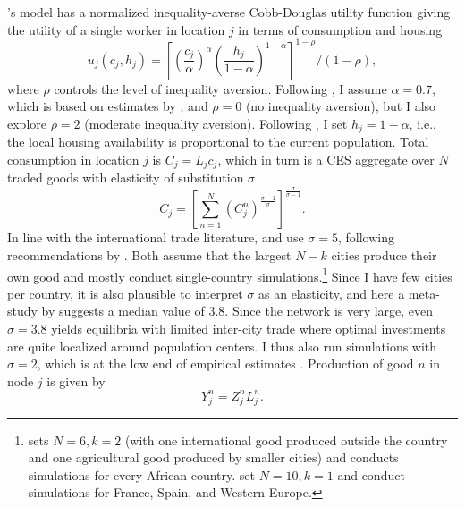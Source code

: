 \documentclass[a4paper]{article}
\begin{document}
\citet{fajgelbaum2020optimal}'s model has a normalized inequality-averse Cobb-Douglas utility function giving the utility of a single worker in location $j$ in terms of consumption and housing
\begin{equation}
u_j(c_j, h_j) = \left[\left(\frac{c_j}{\alpha}\right)^\alpha \left(\frac{h_j}{1-\alpha}\right)^{1-\alpha}\right]^{1-\rho}/(1-\rho),
\end{equation}
where $\rho$ controls the level of inequality aversion. Following \citet{graff2019spatial}, I assume $\alpha = 0.7$, which is based on estimates by \citet{porteous2022reverse}, and $\rho = 0$ (no inequality aversion), but I also explore $\rho = 2$ (moderate inequality aversion). Following \citet{graff2019spatial}, I set $h_j = 1-\alpha$, i.e., the local housing availability is proportional to the current population. Total consumption in location $j$ is $C_j = L_jc_j$, which in turn is a CES aggregate over $N$ traded goods with elasticity of substitution $\sigma$
\begin{equation}
C_j = \left[\sum_{n=1}^N (C_j^n)^\frac{\sigma-1}{\sigma}\right]^\frac{\sigma}{\sigma-1}. 
\end{equation}
In line with the international trade literature, \citet{fajgelbaum2020optimal} and \citet{graff2019spatial} use $\sigma = 5$, following recommendations by \citet{atkin2022role}. Both assume that the largest $N-k$ cities produce their own good and mostly conduct single-country simulations.\footnote{\citet{graff2019spatial} sets $N=6, k = 2$ (with one international good produced outside the country and one agricultural good produced by smaller cities) and conducts simulations for every African country. \citet{fajgelbaum2020optimal} set $N = 10, k = 1$ and conduct simulations for France, Spain, and Western Europe.}
Since I have few cities per country, it is also plausible to interpret $\sigma$ as an \citet{armington1969theory} elasticity, and here a meta-study by \citet{bajzik2020estimating} suggests a median value of 3.8. Since the network is very large, even $\sigma = 3.8$ yields equilibria with limited inter-city trade where optimal investments are quite localized around population centers. I thus also run simulations with $\sigma = 2$, which is at the low end of empirical estimates \citep{bajzik2020estimating}. Production of good $n$ in node $j$ is given by
\begin{equation}
Y_j^n = Z_j^nL_j^n. 
\end{equation}   
\end{document}
